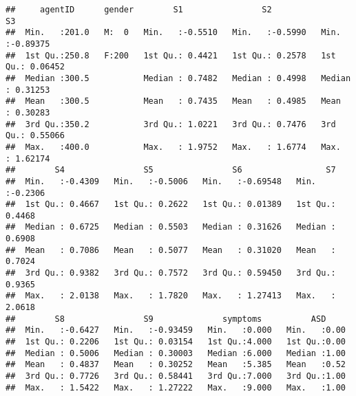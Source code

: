 \documentclass[]{article}
\newenvironment{Shaded}{\begin{snugshade}}{\end{snugshade}}
\newcommand{\KeywordTok}[1]{\textcolor[rgb]{0.13,0.29,0.53}{\textbf{#1}}}
\newcommand{\DecValTok}[1]{\textcolor[rgb]{0.00,0.00,0.81}{#1}}
\newcommand{\StringTok}[1]{\textcolor[rgb]{0.31,0.60,0.02}{#1}}
\newcommand{\CommentTok}[1]{\textcolor[rgb]{0.56,0.35,0.01}{\textit{#1}}}
\newcommand{\OperatorTok}[1]{\textcolor[rgb]{0.81,0.36,0.00}{\textbf{#1}}}
\newcommand{\NormalTok}[1]{#1}
\begin{document}
\begin{verbatim}
##     agentID      gender        S1                S2                S3          
##  Min.   :201.0   M:  0   Min.   :-0.5510   Min.   :-0.5990   Min.   :-0.89375  
##  1st Qu.:250.8   F:200   1st Qu.: 0.4421   1st Qu.: 0.2578   1st Qu.: 0.06452  
##  Median :300.5           Median : 0.7482   Median : 0.4998   Median : 0.31253  
##  Mean   :300.5           Mean   : 0.7435   Mean   : 0.4985   Mean   : 0.30283  
##  3rd Qu.:350.2           3rd Qu.: 1.0221   3rd Qu.: 0.7476   3rd Qu.: 0.55066  
##  Max.   :400.0           Max.   : 1.9752   Max.   : 1.6774   Max.   : 1.62174  
##        S4                S5                S6                 S7         
##  Min.   :-0.4309   Min.   :-0.5006   Min.   :-0.69548   Min.   :-0.2306  
##  1st Qu.: 0.4667   1st Qu.: 0.2622   1st Qu.: 0.01389   1st Qu.: 0.4468  
##  Median : 0.6725   Median : 0.5503   Median : 0.31626   Median : 0.6908  
##  Mean   : 0.7086   Mean   : 0.5077   Mean   : 0.31020   Mean   : 0.7024  
##  3rd Qu.: 0.9382   3rd Qu.: 0.7572   3rd Qu.: 0.59450   3rd Qu.: 0.9365  
##  Max.   : 2.0138   Max.   : 1.7820   Max.   : 1.27413   Max.   : 2.0618  
##        S8                S9              symptoms          ASD      
##  Min.   :-0.6427   Min.   :-0.93459   Min.   :0.000   Min.   :0.00  
##  1st Qu.: 0.2206   1st Qu.: 0.03154   1st Qu.:4.000   1st Qu.:0.00  
##  Median : 0.5006   Median : 0.30003   Median :6.000   Median :1.00  
##  Mean   : 0.4837   Mean   : 0.30252   Mean   :5.385   Mean   :0.52  
##  3rd Qu.: 0.7726   3rd Qu.: 0.58441   3rd Qu.:7.000   3rd Qu.:1.00  
##  Max.   : 1.5422   Max.   : 1.27222   Max.   :9.000   Max.   :1.00
\end{verbatim}

\begin{Shaded}
\end{Shaded}
\end{document}
